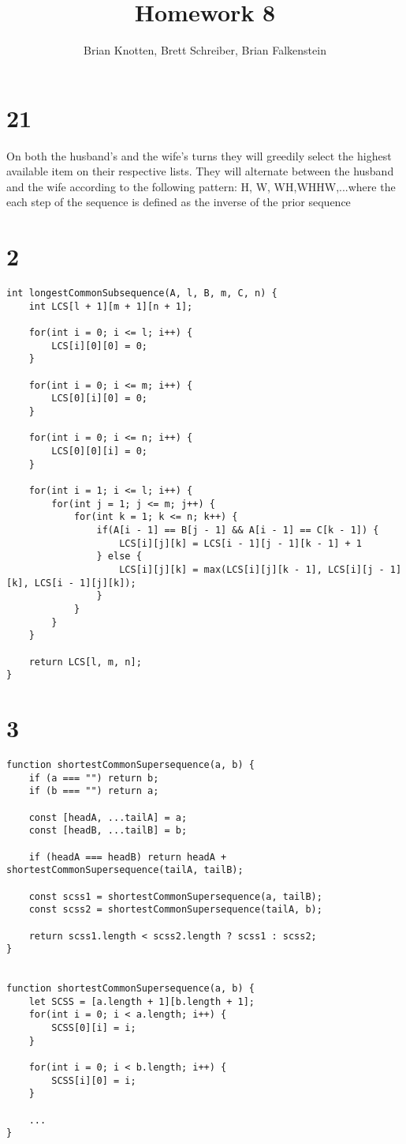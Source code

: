 \documentclass[letterpaper,notitlepage,twoside]{article}
\begin{document}
\title{Homework 8}
\author{Brian Knotten, Brett Schreiber, Brian Falkenstein}
\maketitle

\section*{21}
On both the husband's and the wife's turns they will greedily select the highest available item on their respective lists. They will alternate between the husband and the wife according to the following pattern: H, W, WH,WHHW,...where the each step of the sequence is defined as the inverse of the prior sequence 

\section*{2}
\begin{verbatim}
int longestCommonSubsequence(A, l, B, m, C, n) {
    int LCS[l + 1][m + 1][n + 1];

    for(int i = 0; i <= l; i++) {
        LCS[i][0][0] = 0;
    }

    for(int i = 0; i <= m; i++) {
        LCS[0][i][0] = 0;
    }

    for(int i = 0; i <= n; i++) {
        LCS[0][0][i] = 0;
    }

    for(int i = 1; i <= l; i++) {
        for(int j = 1; j <= m; j++) {
            for(int k = 1; k <= n; k++) {
                if(A[i - 1] == B[j - 1] && A[i - 1] == C[k - 1]) {
                    LCS[i][j][k] = LCS[i - 1][j - 1][k - 1] + 1
                } else {
                    LCS[i][j][k] = max(LCS[i][j][k - 1], LCS[i][j - 1][k], LCS[i - 1][j][k]);
                }
            }
        }
    }

    return LCS[l, m, n];
}
\end{verbatim}
\section*{3}
\begin{verbatim}
function shortestCommonSupersequence(a, b) {
	if (a === "") return b;
	if (b === "") return a;
	
	const [headA, ...tailA] = a;
	const [headB, ...tailB] = b;
	
	if (headA === headB) return headA + shortestCommonSupersequence(tailA, tailB);
	
	const scss1 = shortestCommonSupersequence(a, tailB);
	const scss2 = shortestCommonSupersequence(tailA, b);
	
	return scss1.length < scss2.length ? scss1 : scss2;
}


function shortestCommonSupersequence(a, b) {
	let SCSS = [a.length + 1][b.length + 1];
	for(int i = 0; i < a.length; i++) {
		SCSS[0][i] = i;
	}
	
	for(int i = 0; i < b.length; i++) {
		SCSS[i][0] = i;
	}
  
	...
}
\end{verbatim}
\end{document}
